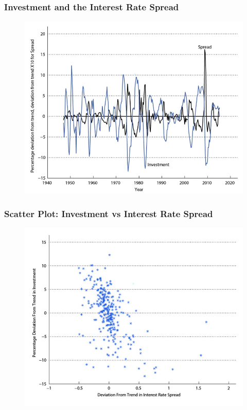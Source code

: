 \documentclass{beamer}
\begin{document}
\begin{frame}
\frametitle[alignment=center]{Investment and the Interest Rate Spread}
\begin{figure}
\centering
\includegraphics[scale=0.6]{Figures/W_Fig_11pt12.png}
\end{figure}
\end{frame}

\begin{frame}
\frametitle[alignment=center]{Scatter Plot: Investment vs Interest Rate Spread}
\begin{figure}
\centering
\includegraphics[scale=0.6]{Figures/W_Fig_11pt13.png}
\end{figure}
\end{frame}
\end{document}
